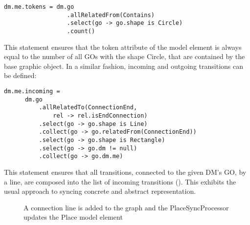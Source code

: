 \begin{lstlisting}[captionpos=b,caption={Rule that syncs the token count of a place element}]
dm.me.tokens = dm.go
                  .allRelatedFrom(Contains)
                  .select(go -> go.shape is Circle)
                  .count()
\end{lstlisting}

This statement ensures that the token attribute of the model element is always equal to the number of all GOs with the shape Circle, that are contained by the base graphic object. In a similar fashion, incoming and outgoing transitions can be defined:
\begin{lstlisting}[captionpos=b,caption={Rule that syncs incoming transitions of a place element},label={lst:incoming-transitions}]
dm.me.incoming = 
      dm.go
          .allRelatedTo(ConnectionEnd,
              rel -> rel.isEndConnection)
          .select(go -> go.shape is Line)
          .collect(go -> go.relatedFrom(ConnectionEnd))
          .select(go -> go.shape is Rectangle)
          .select(go -> go.dm != null)
          .collect(go -> go.dm.me)
\end{lstlisting}

This statement ensures that all transitions, connected to the given DM's GO, by a line, are composed into the list of incoming transitions (). This exhibits the usual approach to syncing concrete and abstract representation.


\begin{figure}
  \centering
  
  \caption{A connection line is added to the graph and the PlaceSyncProcessor updates the Place model element}
  \label{fig:incoming-sync}
\end{figure}

